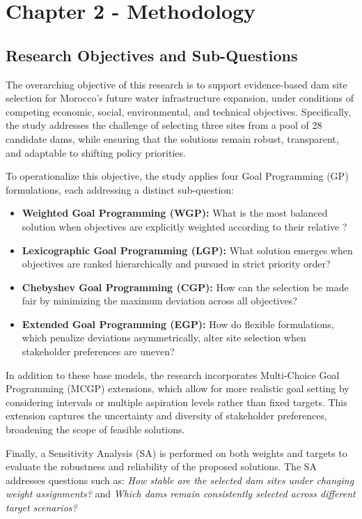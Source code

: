 \section{Chapter 2 - Methodology}\label{sec:methodology}

\subsection*{Research Objectives and Sub-Questions}
The overarching objective of this research is to support evidence-based dam site selection 
for Morocco’s future water infrastructure expansion, under conditions of competing 
economic, social, environmental, and technical objectives. Specifically, the study addresses the challenge of selecting three sites from a pool of 28 candidate dams, while ensuring that the solutions remain robust, transparent, and adaptable to shifting policy priorities.

To operationalize this objective, the study applies four Goal Programming (GP) formulations, 
each addressing a distinct sub-question:

\begin{itemize}
    \item \textbf{Weighted Goal Programming (WGP):} What is the most balanced solution when 
    objectives are explicitly weighted according to their relative      ?
    \item \textbf{Lexicographic Goal Programming (LGP):} What solution emerges when objectives 
    are ranked hierarchically and pursued in strict priority order?
    \item \textbf{Chebyshev Goal Programming (CGP):} How can the selection be made fair by 
    minimizing the maximum deviation across all objectives?
    \item \textbf{Extended Goal Programming (EGP):} How do flexible formulations, which 
    penalize deviations asymmetrically, alter site selection when stakeholder preferences 
    are uneven?
\end{itemize}

In addition to these base models, the research incorporates Multi-Choice Goal Programming (MCGP) extensions, which allow for more realistic goal setting by considering intervals or multiple aspiration levels rather than fixed targets. This extension captures the uncertainty and diversity of stakeholder preferences, broadening the scope of feasible solutions.

Finally, a Sensitivity Analysis (SA) is performed on both weights and targets to 
evaluate the robustness and reliability of the proposed solutions. The SA addresses questions 
such as: \textit{How stable are the selected dam sites under changing weight assignments?} and 
\textit{Which dams remain consistently selected across different target scenarios?}

